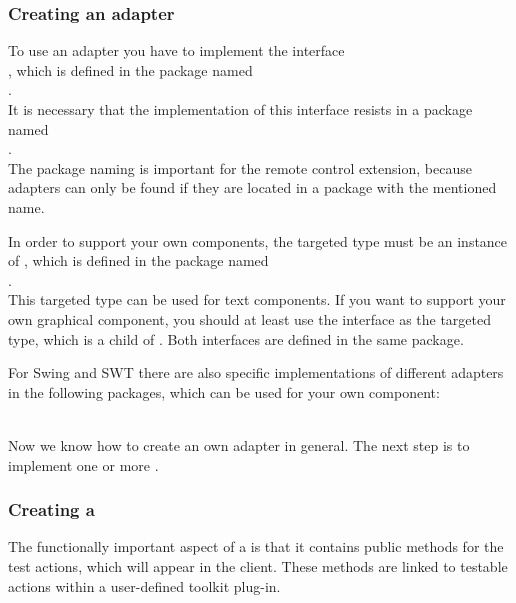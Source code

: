\subsubsection{Creating an adapter}

To use an adapter you have to implement the interface\\
, which is defined in the package named\\
.\\
It is necessary that the implementation of this interface resists in a package
named\\
.\\
The package naming is important for the remote control extension, because
adapters can only be found if they are located in a package with the mentioned name.

In order to support your own components, the targeted type must be an instance
of , which is defined in the package named\\
.\\
This targeted type can be used for text components. If you want to support your
own graphical component, you should at least use the interface
 as the targeted type, which is a child of
. Both interfaces are defined in the same package.

For Swing and SWT there are also specific implementations of different
adapters in the following packages, which can be used for your own component:\\
\\

Now we know how to create an own adapter in general. The next step is to
implement one or more \gdtesterclass. 

\subsubsection{Creating a \gdtesterclass}

The functionally important aspect of a \gdtesterclass is that it
contains public methods for the test actions, which will appear in
the client. These methods are linked to testable actions within a user-defined
\ite{} toolkit plug-in.

